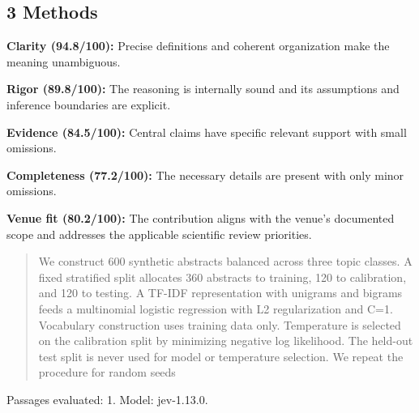\documentclass[11pt]{article}
\begin{document}
\subsection{3 Methods}
\par\textbf{Clarity (94.8/100):} Precise definitions and coherent organization make the meaning unambiguous.
\par\textbf{Rigor (89.8/100):} The reasoning is internally sound and its assumptions and inference boundaries are explicit.
\par\textbf{Evidence (84.5/100):} Central claims have specific relevant support with small omissions.
\par\textbf{Completeness (77.2/100):} The necessary details are present with only minor omissions.
\par\textbf{Venue fit (80.2/100):} The contribution aligns with the venue's documented scope and addresses the applicable scientific review priorities.
\begin{quote}\small We construct 600 synthetic abstracts balanced across three topic classes. A fixed stratified split
allocates 360 abstracts to training, 120 to calibration, and 120 to testing. A TF-IDF representation with
unigrams and bigrams feeds a multinomial logistic regression with L2 regularization and C=1.
Vocabulary construction uses training data only. Temperature is selected on the calibration split by
minimizing negative log likelihood. The held-out test split is never used for model or temperature
selection. We repeat the procedure for random seeds \end{quote}
Passages evaluated: 1. Model: jev-1.13.0.
\end{document}
